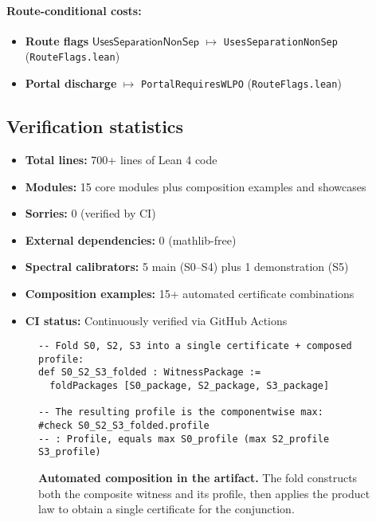 \documentclass[11pt]{article}
\newcommand{\lean}[1]{\texttt{#1}}
\theoremstyle{plain}
\theoremstyle{definition}
\theoremstyle{remark}
\newcommand{\UsesSeparationNonSep}{\mathsf{UsesSeparationNonSep}}
\begin{document}
\paragraph{Route-conditional costs:}
\begin{itemize}
\item \textbf{Route flags} $\UsesSeparationNonSep$ $\mapsto$ \lean{UsesSeparationNonSep} (\texttt{RouteFlags.lean})
\item \textbf{Portal discharge} $\mapsto$ \lean{PortalRequiresWLPO} (\texttt{RouteFlags.lean})
\end{itemize}

\subsection{Verification statistics}
\begin{itemize}
\item \textbf{Total lines:} 700+ lines of Lean 4 code
\item \textbf{Modules:} 15 core modules plus composition examples and showcases
\item \textbf{Sorries:} 0 (verified by CI)
\item \textbf{External dependencies:} 0 (mathlib-free)
\item \textbf{Spectral calibrators:} 5 main (S0--S4) plus 1 demonstration (S5)
\item \textbf{Composition examples:} 15+ automated certificate combinations
\item \textbf{CI status:} Continuously verified via GitHub Actions
\end{itemize}


\begin{figure}[t]
\centering
\begin{minipage}{0.92\linewidth}
\begin{verbatim}
-- Fold S0, S2, S3 into a single certificate + composed profile:
def S0_S2_S3_folded : WitnessPackage :=
  foldPackages [S0_package, S2_package, S3_package]

-- The resulting profile is the componentwise max:
#check S0_S2_S3_folded.profile
-- : Profile, equals max S0_profile (max S2_profile S3_profile)
\end{verbatim}
\end{minipage}
\caption{\textbf{Automated composition in the artifact.}
The fold constructs both the composite witness and its profile, then applies the
product law to obtain a single certificate for the conjunction.}
\label{fig:lean-folding-snippet}
\end{figure}
\end{document}
